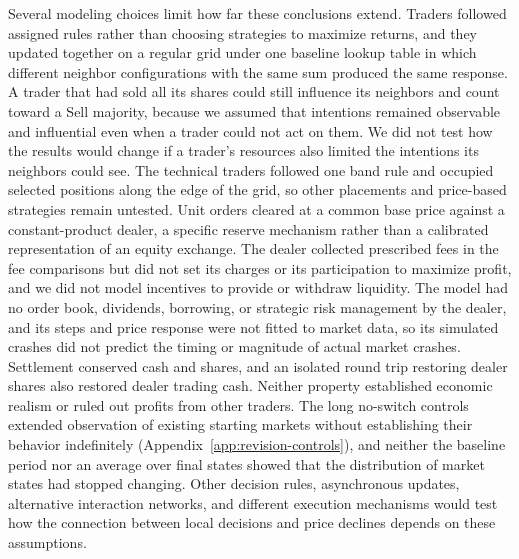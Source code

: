 Several modeling choices limit how far these conclusions extend. Traders
followed assigned rules rather than choosing strategies to maximize
returns, and they updated together on a regular grid under one baseline
lookup table in which different neighbor configurations with the same
sum produced the same response. A trader that had sold all its shares
could still influence its neighbors and count toward a Sell majority,
because we assumed that intentions remained observable and influential even when a trader could not act on them. We did not test how the results would
change if a trader's resources also limited the intentions its neighbors
could see. The technical traders followed one band rule and occupied
selected positions along the edge of the grid, so other placements and
price-based strategies remain untested. Unit orders cleared at a common
base price against a constant-product dealer, a specific reserve
mechanism rather than a calibrated representation of an equity
exchange. The dealer collected prescribed fees in the fee comparisons
but did not set its charges or its participation to maximize profit, and
we did not model incentives to provide or withdraw liquidity. The model
had no order book, dividends, borrowing, or strategic risk management by
the dealer, and its steps and price response were not fitted to market
data, so its simulated crashes did not predict the timing or magnitude of actual market crashes. Settlement conserved cash and shares, and an isolated round trip
restoring dealer shares also restored dealer trading cash. Neither
property established economic realism or ruled out profits from other
traders. The long no-switch controls
extended observation of existing starting markets without establishing
their behavior indefinitely (Appendix~\ref{app:revision-controls}), and
neither the baseline period nor an average over final states showed that
the distribution of market states had stopped changing. Other decision
rules, asynchronous updates, alternative interaction networks, and
different execution mechanisms would test how the connection between
local decisions and price declines depends on these assumptions.
